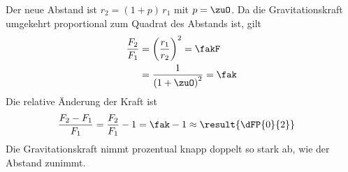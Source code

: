 Der neue Abstand ist $r_2 = (1+p)\,r_1$ mit $p = \zuO$. Da die Gravitationskraft umgekehrt proportional zum Quadrat des Abstands ist, gilt
\begin{align}
 \frac{F_2}{F_1} &= \left(\frac{r_1}{r_2}\right)^2 = \fakF \\
   &= \frac{1}{\left(1+\zuO\right)^2} = \fak
\end{align}
Die relative Änderung der Kraft ist
\begin{align}
 \frac{F_2-F_1}{F_1} &= \frac{F_2}{F_1}-1 = \fak-1 \approx \result{\dFP{0}{2}}
\end{align}
Die Gravitationskraft nimmt prozentual knapp doppelt so stark ab, wie der Abstand zunimmt.
